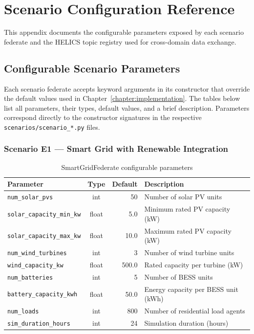 \chapter{Scenario Configuration Reference}
\label{appendix:config}

This appendix documents the configurable parameters exposed by each scenario federate and the HELICS topic registry used for cross-domain data exchange.

\section{Configurable Scenario Parameters}
\label{sec:appendix-params}

Each scenario federate accepts keyword arguments in its constructor that override the default values used in Chapter~\ref{chapter:implementation}. The tables below list all parameters, their types, default values, and a brief description. Parameters correspond directly to the constructor signatures in the respective \texttt{scenarios/scenario\_*.py} files.

\subsection*{Scenario E1 --- Smart Grid with Renewable Integration}

\begin{table}[h]
    \centering
    \caption{SmartGridFederate configurable parameters}
    \label{tab:params-e1}
    \small
    \begin{tabular}{|l|c|r|p{6cm}|}
        \hline
        \textbf{Parameter} & \textbf{Type} & \textbf{Default} & \textbf{Description} \\
        \hline
        \texttt{num\_solar\_pvs}        & int   & 50    & Number of solar PV units \\
        \hline
        \texttt{solar\_capacity\_min\_kw} & float & 5.0 & Minimum rated PV capacity (kW) \\
        \hline
        \texttt{solar\_capacity\_max\_kw} & float & 10.0 & Maximum rated PV capacity (kW) \\
        \hline
        \texttt{num\_wind\_turbines}    & int   & 3     & Number of wind turbine units \\
        \hline
        \texttt{wind\_capacity\_kw}     & float & 500.0 & Rated capacity per turbine (kW) \\
        \hline
        \texttt{num\_batteries}         & int   & 5     & Number of BESS units \\
        \hline
        \texttt{battery\_capacity\_kwh} & float & 50.0  & Energy capacity per BESS unit (kWh) \\
        \hline
        \texttt{num\_loads}             & int   & 800   & Number of residential load agents \\
        \hline
        \texttt{sim\_duration\_hours}   & int   & 24    & Simulation duration (hours) \\
        \hline
    \end{tabular}
\end{table}

